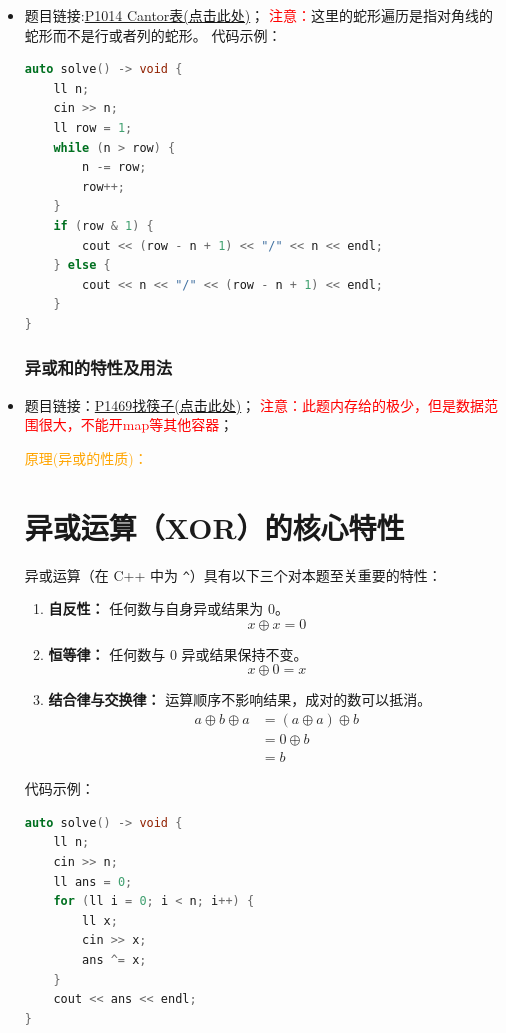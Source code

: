 \begin{itemize}
\begin{lstlisting}[language=C++]
auto solve() -> void {
	ll cnt = 0;
	ll a0, a1, b0, b1;
	cin >> a0 >> a1 >> b0 >> b1;
	for (ll x = 1; x * x <= b1; x++) {
		if (b1 % x == 0) {
			if (gcd(a0, x) == a1 && lcm(x, b0) == b1) {
				cnt++;
			}
			//注意这里之前说过：若x是b1的因数，则b1/x也是b1的因数
			ll d = b1 / x;
			if (d != x) {
				if (gcd(a0, d) == a1 && lcm(d, b0) == b1) {
					cnt++;
				}
			}
		}
	}
	cout << cnt << endl;
}
\end{lstlisting}
\subsubsection{康托尔折线(z字形--蛇形矩阵遍历)}
\item 题目链接:\href{https://www.luogu.com.cn/problem/P1014}{P1014 Cantor表(点击此处)}；
\textcolor{red}{注意：}这里的蛇形遍历是指对角线的蛇形而不是行或者列的蛇形。
代码示例：\\
\begin{lstlisting}[language=C++]
auto solve() -> void {
	ll n;
	cin >> n;
	ll row = 1;
	while (n > row) {
		n -= row;
		row++;
	}
	if (row & 1) {
		cout << (row - n + 1) << "/" << n << endl;
	} else {
		cout << n << "/" << (row - n + 1) << endl;
	}
}
\end{lstlisting}
\subsubsection{异或和的特性及用法}
\item 题目链接：\href{https://www.luogu.com.cn/problem/P1469}{P1469找筷子(点击此处)}；
\textcolor{red}{注意：此题内存给的极少，但是数据范围很大，不能开map等其他容器}；

\textcolor{orange}{原理(异或的性质)：}
\section*{异或运算（XOR）的核心特性}

异或运算（在 C++ 中为 \texttt{\^}）具有以下三个对本题至关重要的特性：

\begin{enumerate}
	\item \textbf{自反性：} 任何数与自身异或结果为 0。
	\[ x \oplus x = 0 \]
	
	\item \textbf{恒等律：} 任何数与 0 异或结果保持不变。
	\[ x \oplus 0 = x \]
	
	\item \textbf{结合律与交换律：} 运算顺序不影响结果，成对的数可以抵消。
	\begin{align*}
		a \oplus b \oplus a &= (a \oplus a) \oplus b \\
		&= 0 \oplus b \\
		&= b
	\end{align*}
\end{enumerate}
代码示例：\\
\begin{lstlisting}[language=C++]
auto solve() -> void {
	ll n;
	cin >> n;
	ll ans = 0;
	for (ll i = 0; i < n; i++) {
		ll x;
		cin >> x;
		ans ^= x;
	}
	cout << ans << endl;
}
\end{lstlisting}
\end{itemize}
